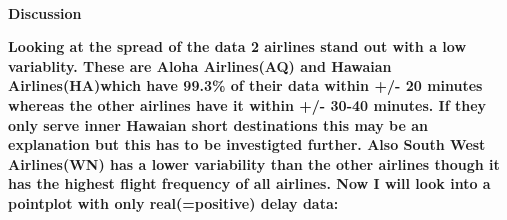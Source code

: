 \documentclass[11pt]{article}
\begin{document}
    \begin{center}
    \end{center}
    { \hspace*{\fill} \\}
    
    \textbf{Discussion}

\textbf{Looking at the spread of the data 2 airlines stand out with a
low variablity. These are Aloha Airlines(AQ) and Hawaian
Airlines(HA)which have 99.3\% of their data within +/- 20 minutes
whereas the other airlines have it within +/- 30-40 minutes. If they
only serve inner Hawaian short destinations this may be an explanation
but this has to be investigted further. Also South West Airlines(WN) has
a lower variability than the other airlines though it has the highest
flight frequency of all airlines. Now I will look into a pointplot with
only real(=positive) delay data:}
\end{document}
